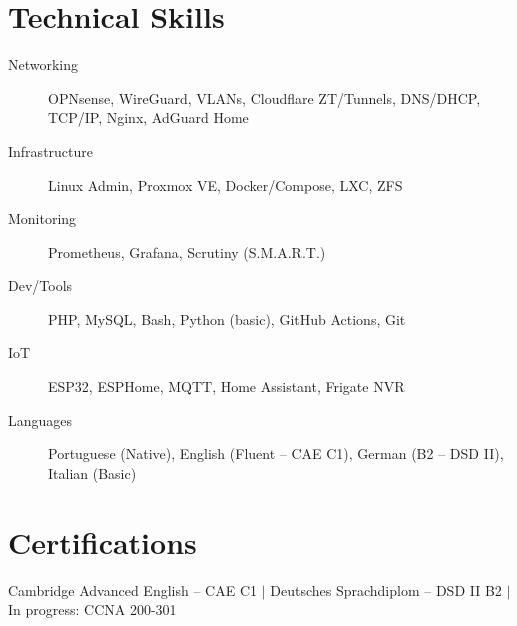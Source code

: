 \documentclass[11pt]{article}
\begin{document}
\section{Technical Skills}
\begin{description}
    \item[Networking] OPNsense, WireGuard, VLANs, Cloudflare ZT/Tunnels, DNS/DHCP, TCP/IP, Nginx, AdGuard Home
    \item[Infrastructure] Linux Admin, Proxmox VE, Docker/Compose, LXC, ZFS
    \item[Monitoring] Prometheus, Grafana, Scrutiny (S.M.A.R.T.)
    \item[Dev/Tools] PHP, MySQL, Bash, Python (basic), GitHub Actions, Git
    \item[IoT] ESP32, ESPHome, MQTT, Home Assistant, Frigate NVR
    \item[Languages] Portuguese (Native), English (Fluent -- CAE C1), German (B2 -- DSD II), Italian (Basic)
\end{description}

\section{Certifications}
Cambridge Advanced English -- CAE C1 $|$ Deutsches Sprachdiplom -- DSD II B2 $|$ In progress: CCNA 200-301
\end{document}
